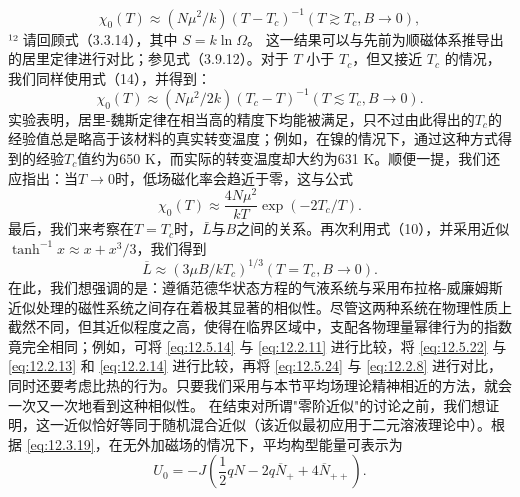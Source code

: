 \begin{equation}\tag{12.5.20}\label{eq:12.5.20}
\chi _ { 0 } ( T ) \approx ( N \mu ^{2} / k ) ( T - T _ { c } ) ^{- 1}  ( T \gtrsim T _ { c } , B \to 0 ) ,
\end{equation}
¹² 请回顾式（3.3.14），其中 \(S = k\ln\Omega\)。
这一结果可以与先前为顺磁体系推导出的居里定律进行对比；参见式（3.9.12）。对于 \(T\) 小于 \(T_{c}\)，但又接近 \(T_{c}\) 的情况，我们同样使用式（14），并得到：
\begin{equation}\tag{12.5.21}\label{eq:12.5.21}
\chi _ { 0 } ( T ) \approx ( N \mu ^{2} / 2 k ) ( T _ { c } - T ) ^{- 1}  ( T \lesssim T _ { c } , B \to 0 ) .
\end{equation}
实验表明，居里-魏斯定律在相当高的精度下均能被满足，只不过由此得出的\(T_{c}\)的经验值总是略高于该材料的真实转变温度；例如，在镍的情况下，通过这种方式得到的经验\(T_{c}\)值约为650 K，而实际的转变温度却大约为631 K。顺便一提，我们还应指出：当\(T \rightarrow 0\)时，低场磁化率会趋近于零，这与公式
\begin{equation}\tag{12.5.22}\label{eq:12.5.22}
\chi _ { 0 } ( T ) \approx \frac { 4 N \mu ^{2} } { k T } \exp ( - 2 T _ { c } / T ) .
\end{equation}
最后，我们来考察在\(T = T_{c}\)时，\(\bar{L}\)与\(B\)之间的关系。再次利用式（10），并采用近似 \(\tanh^{-1}x \approx x + x^{3}/3\)，我们得到
\begin{equation}\tag{12.5.23}\label{eq:12.5.23}
\overline { { L } } \approx ( 3 \mu B / k T _ { c } ) ^{1 / 3}  ( T = T _ { c } , B \rightarrow 0 ) .
\end{equation}
在此，我们想强调的是：遵循范德华状态方程的气液系统与采用布拉格-威廉姆斯近似处理的磁性系统之间存在着极其显著的相似性。尽管这两种系统在物理性质上截然不同，但其近似程度之高，使得在临界区域中，支配各物理量幂律行为的指数竟完全相同；例如，可将 \autoref{eq:12.5.14} 与 \autoref{eq:12.2.11} 进行比较，将 \autoref{eq:12.5.22} 与 \autoref{eq:12.2.13} 和 \autoref{eq:12.2.14} 进行比较，再将 \autoref{eq:12.5.24} 与 \autoref{eq:12.2.8} 进行对比，同时还要考虑比热的行为。只要我们采用与本节平均场理论精神相近的方法，就会一次又一次地看到这种相似性。
在结束对所谓"零阶近似"的讨论之前，我们想证明，这一近似恰好等同于随机混合近似（该近似最初应用于二元溶液理论中）。根据 \autoref{eq:12.3.19}，在无外加磁场的情况下，平均构型能量可表示为
\begin{equation}\tag{12.5.24}\label{eq:12.5.24}
U _ { 0 } = - J \left( \frac { 1 } { 2 } q N - 2 q \overline { { N } } _ { + } + 4 \overline { { N } } _ { + + } \right) .
\end{equation}
